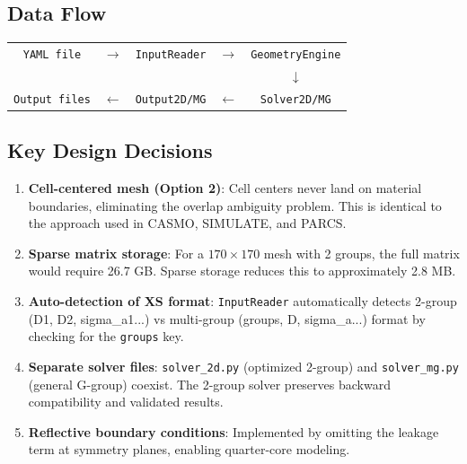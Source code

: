 \documentclass[12pt,a4paper]{article}
\begin{document}
\subsection{Data Flow}

\begin{center}
\begin{tabular}{ccccc}
\texttt{YAML file}
& $\longrightarrow$ & \texttt{InputReader}
& $\longrightarrow$ & \texttt{GeometryEngine} \\
& & & & $\downarrow$ \\
\texttt{Output files}
& $\longleftarrow$ & \texttt{Output2D/MG}
& $\longleftarrow$ & \texttt{Solver2D/MG} \\
\end{tabular}
\end{center}

\subsection{Key Design Decisions}

\begin{enumerate}
    \item \textbf{Cell-centered mesh (Option 2)}: Cell centers never land on
    material boundaries, eliminating the overlap ambiguity problem. This is
    identical to the approach used in CASMO, SIMULATE, and PARCS.

    \item \textbf{Sparse matrix storage}: For a $170\times170$ mesh with
    2 groups, the full matrix would require 26.7 GB. Sparse storage reduces
    this to approximately 2.8 MB.

    \item \textbf{Auto-detection of XS format}: \texttt{InputReader}
    automatically detects 2-group (D1, D2, sigma\_a1...) vs multi-group
    (groups, D, sigma\_a...) format by checking for the \texttt{groups} key.

    \item \textbf{Separate solver files}: \texttt{solver\_2d.py} (optimized
    2-group) and \texttt{solver\_mg.py} (general G-group) coexist. The
    2-group solver preserves backward compatibility and validated results.

    \item \textbf{Reflective boundary conditions}: Implemented by omitting the
    leakage term at symmetry planes, enabling quarter-core modeling.
\end{enumerate}

\end{document}
